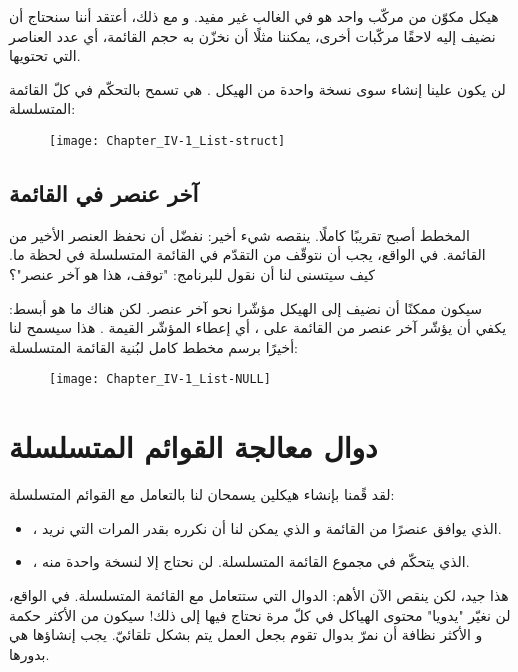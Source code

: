 \begin{information}
هيكل مكوّن من مركّب واحد هو في الغالب غير مفيد. و مع ذلك، أعتقد أننا سنحتاج أن نضيف إليه لاحقًا مركّبات أخرى، يمكننا مثلًا أن نخزّن به حجم القائمة، أي عدد العناصر التي تحتويها.
\end{information}

لن يكون علينا إنشاء سوى نسخة واحدة من الهيكل
.
هي تسمح بالتحكّم في كلّ القائمة المتسلسلة:
 
\begin{figure}[H]
	\centering
	\texttt{[image: Chapter\_IV-1\_List-struct]}
\end{figure}

\subsection{آخر عنصر في القائمة}

المخطط أصبح تقريبًا كاملًا. ينقصه شيء أخير: نفضّل أن نحفظ العنصر الأخير من القائمة. في الواقع، يجب أن نتوقّف من التقدّم في القائمة المتسلسلة في لحظة ما. كيف سيتسنى لنا أن نقول للبرنامج: "توقف، هذا هو آخر عنصر"؟

سيكون ممكنًا أن نضيف إلى الهيكل 
مؤشّرا نحو آخر عنصر. لكن هناك ما هو أبسط: يكفي أن يؤشّر آخر عنصر من القائمة على
،
أي إعطاء المؤشّر
القيمة
.
هذا سيسمح لنا أخيرًا برسم مخطط كامل لبُنية القائمة المتسلسلة:

\begin{figure}[H]
	\centering
	\texttt{[image: Chapter\_IV-1\_List-NULL]}
\end{figure}

\section{دوال معالجة القوائم المتسلسلة}

لقد قًمنا بإنشاء هيكلين يسمحان لنا بالتعامل مع القوائم المتسلسلة:

\begin{itemize}
	\item {}،
	الذي يوافق عنصرًا من القائمة و الذي يمكن لنا أن نكرره بقدر المرات التي نريد.
	\item {}،
	الذي يتحكّم في مجموع القائمة المتسلسلة. لن نحتاج إلا لنسخة واحدة منه.
\end{itemize}

هذا جيد، لكن ينقص الآن الأهم: الدوال التي ستتعامل مع القائمة المتسلسلة. في الواقع، لن نغيّر "يدويا" محتوى الهياكل في كلّ مرة نحتاج فيها إلى ذلك! سيكون من الأكثر حكمة و الأكثر نظافة أن نمرّ بدوال تقوم بجعل العمل يتم بشكل تلقائيّ. يجب إنشاؤها هي بدورها.

